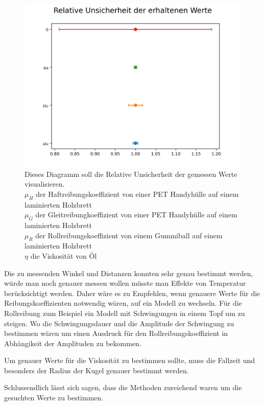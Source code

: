\documentclass[11pt,ngerman]{scrartcl}
\begin{document}
\begin{figure}[H]
    \centering
    \includegraphics[width=0.8\linewidth]{pics/ergebnisse.png}
    \caption{Dieses Diagramm soll die Relative Unsicherheit der gemessen Werte visualisieren.\\
    $\mu_H$ der Haftreibungskoeffizient von einer PET Handyhülle auf einem laminierten Holzbrett\\ 
    $\mu_G$ der Gleitreibungkoeffizient von einer PET Handyhülle auf einem laminierten Holzbrett\\
    $\mu_R$ der Rollreibungskoeffizient von einem Gummiball auf einem laminierten Holzbrett\\
    $\eta$ die Viskosität von Öl\\
    }%
    \label{fig:pics/ergebnisse}
\end{figure}


Die zu messenden Winkel und Distanzen konnten sehr genau bestimmt werden, würde
man noch genauer messen wollen müsste man Effekte von Temperatur berücksichtigt
werden. Daher wäre es zu Empfehlen, wenn genauere Werte für die
Reibungskoeffizienten notwendig wären, auf ein Modell zu wechseln. Für die
Rollreibung zum Beispiel ein Modell mit Schwingungen in einem Topf um zu
steigen.  Wo die Schwingungsdauer und die Amplitude der Schwingung zu bestimmen
wären um einen Ausdruck für den Rollreibungskoeffizient in Abhängikeit der
Amplituden zu bekommen.

Um genauer Werte für die Viskosität zu bestimmen sollte, muss die Fallzeit
und besonders der Radius der Kugel genauer bestimmt werden.

Schlussendlich lässt sich sagen, dass die Methoden zureichend waren
um die gesuchten Werte zu bestimmen.
\newpage
\printbibliography

\listoffigures

\listoftables
\end{document}
